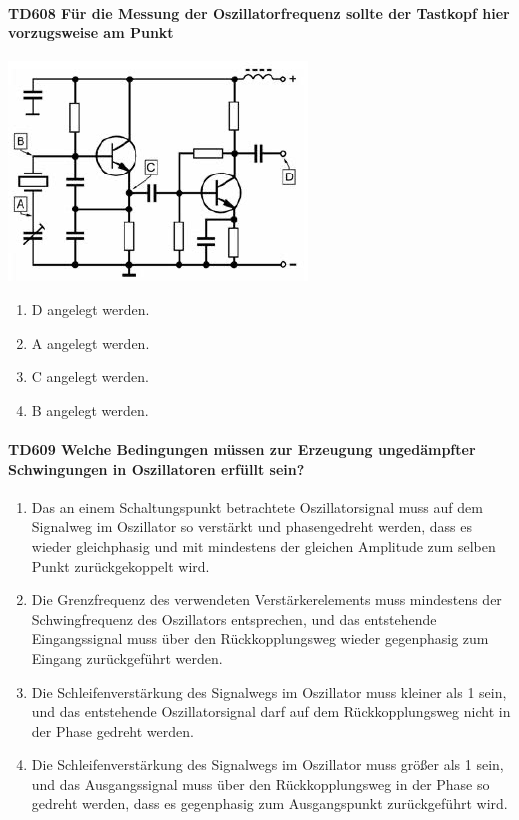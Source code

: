\documentclass[8pt]{article}
\begin{document}
\begin{enumerate}
\begin{enumerate}[nolistsep,label=\Alph*]
\paragraph*{TD608 Für die Messung der Oszillatorfrequenz sollte der Tastkopf hier vorzugsweise am Punkt}
\begin{center}
	\begin{minipage}{\linewidth}
		\centering
		\includegraphics[scale=1.0]{pics/td608_a.jpg}
	\end{minipage}
\end{center}
\begin{enumerate}[nolistsep,label=\Alph*]
\item D angelegt werden.
\item A angelegt werden.
\item C angelegt werden.
\item B angelegt werden.
\end{enumerate}

\paragraph*{TD609 Welche Bedingungen müssen zur Erzeugung ungedämpfter Schwingungen in Oszillatoren erfüllt sein?}
\begin{enumerate}[nolistsep,label=\Alph*]
\item Das an einem Schaltungspunkt betrachtete Oszillatorsignal muss auf dem Signalweg im Oszillator so verstärkt und phasengedreht werden, dass es wieder gleichphasig und mit mindestens der gleichen Amplitude zum selben Punkt zurückgekoppelt wird.
\item Die Grenzfrequenz des verwendeten Verstärkerelements muss mindestens der Schwingfrequenz des Oszillators entsprechen, und das entstehende Eingangssignal muss über den Rückkopplungsweg wieder gegenphasig zum Eingang zurückgeführt werden.
\item Die Schleifenverstärkung des Signalwegs im Oszillator muss kleiner als 1 sein, und das entstehende Oszillatorsignal darf auf dem Rückkopplungsweg nicht in der Phase gedreht werden.
\item Die Schleifenverstärkung des Signalwegs im Oszillator muss größer als 1 sein, und das Ausgangssignal muss über den Rückkopplungsweg in der Phase so gedreht werden, dass es gegenphasig zum Ausgangspunkt zurückgeführt wird.
\end{enumerate}


\end{enumerate}
\end{enumerate}
\end{document}
